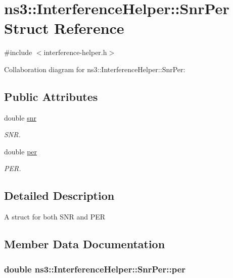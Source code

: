\hypertarget{structns3_1_1InterferenceHelper_1_1SnrPer}{}\section{ns3\+:\+:Interference\+Helper\+:\+:Snr\+Per Struct Reference}
\label{structns3_1_1InterferenceHelper_1_1SnrPer}


{\ttfamily \#include $<$interference-\/helper.\+h$>$}



Collaboration diagram for ns3\+:\+:Interference\+Helper\+:\+:Snr\+Per\+:
\subsection*{Public Attributes}
\begin{DoxyCompactItemize}
\item 
double \hyperlink{structns3_1_1InterferenceHelper_1_1SnrPer_a8ad3288a62949ad678c08a64f2e1e655}{snr}
\begin{DoxyCompactList}\small\item\em S\+NR. \end{DoxyCompactList}\item 
double \hyperlink{structns3_1_1InterferenceHelper_1_1SnrPer_a668e16537480e30bd4cb5dae02f06894}{per}
\begin{DoxyCompactList}\small\item\em P\+ER. \end{DoxyCompactList}\end{DoxyCompactItemize}


\subsection{Detailed Description}
A struct for both S\+NR and P\+ER 

\subsection{Member Data Documentation}
\subsubsection[{\texorpdfstring{per}{per}}]{\setlength{\rightskip}{0pt plus 5cm}double ns3\+::\+Interference\+Helper\+::\+Snr\+Per\+::per}\hypertarget{structns3_1_1InterferenceHelper_1_1SnrPer_a668e16537480e30bd4cb5dae02f06894}{}\label{structns3_1_1InterferenceHelper_1_1SnrPer_a668e16537480e30bd4cb5dae02f06894}


